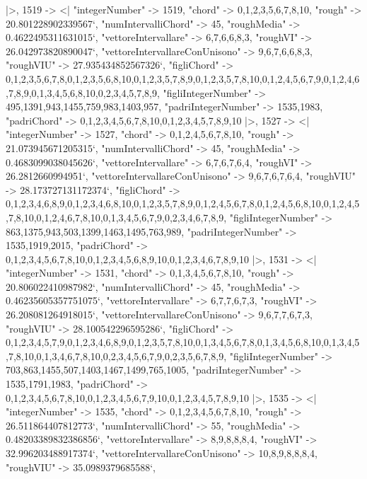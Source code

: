 \documentclass[
]{article}
\begin{document}
\begin{DatasetVerbatim}
  |>,
  1519 -> <|
    "integerNumber" -> 1519,
    "chord" -> {0,1,2,3,5,6,7,8,10},
    "rough" -> 20.801228902339567`,
    "numIntervalliChord" -> 45,
    "roughMedia" -> 0.4622495311631015`,
    "vettoreIntervallare" -> {6,7,6,6,8,3},
    "roughVI" -> 26.042973820890047`,
    "vettoreIntervallareConUnisono" -> {9,6,7,6,6,8,3},
    "roughVIU" -> 27.935434852567326`,
    "figliChord" -> {{0,1,2,3,5,6,7,8},{0,1,2,3,5,6,8,10},{0,1,2,3,5,7,8,9},{0,1,2,3,5,7,8,10},{0,1,2,4,5,6,7,9},{0,1,2,4,6,7,8,9},{0,1,3,4,5,6,8,10},{0,2,3,4,5,7,8,9}},
    "figliIntegerNumber" -> {495,1391,943,1455,759,983,1403,957},
    "padriIntegerNumber" -> {1535,1983},
    "padriChord" -> {{0,1,2,3,4,5,6,7,8,10},{0,1,2,3,4,5,7,8,9,10}}
  |>,
  1527 -> <|
    "integerNumber" -> 1527,
    "chord" -> {0,1,2,4,5,6,7,8,10},
    "rough" -> 21.073945671205315`,
    "numIntervalliChord" -> 45,
    "roughMedia" -> 0.4683099038045626`,
    "vettoreIntervallare" -> {6,7,6,7,6,4},
    "roughVI" -> 26.2812660994951`,
    "vettoreIntervallareConUnisono" -> {9,6,7,6,7,6,4},
    "roughVIU" -> 28.173727131172374`,
    "figliChord" -> {{0,1,2,3,4,6,8,9},{0,1,2,3,4,6,8,10},{0,1,2,3,5,7,8,9},{0,1,2,4,5,6,7,8},{0,1,2,4,5,6,8,10},{0,1,2,4,5,7,8,10},{0,1,2,4,6,7,8,10},{0,1,3,4,5,6,7,9},{0,2,3,4,6,7,8,9}},
    "figliIntegerNumber" -> {863,1375,943,503,1399,1463,1495,763,989},
    "padriIntegerNumber" -> {1535,1919,2015},
    "padriChord" -> {{0,1,2,3,4,5,6,7,8,10},{0,1,2,3,4,5,6,8,9,10},{0,1,2,3,4,6,7,8,9,10}}
  |>,
  1531 -> <|
    "integerNumber" -> 1531,
    "chord" -> {0,1,3,4,5,6,7,8,10},
    "rough" -> 20.806022410987982`,
    "numIntervalliChord" -> 45,
    "roughMedia" -> 0.46235605357751075`,
    "vettoreIntervallare" -> {6,7,7,6,7,3},
    "roughVI" -> 26.208081264918015`,
    "vettoreIntervallareConUnisono" -> {9,6,7,7,6,7,3},
    "roughVIU" -> 28.100542296595286`,
    "figliChord" -> {{0,1,2,3,4,5,7,9},{0,1,2,3,4,6,8,9},{0,1,2,3,5,7,8,10},{0,1,3,4,5,6,7,8},{0,1,3,4,5,6,8,10},{0,1,3,4,5,7,8,10},{0,1,3,4,6,7,8,10},{0,2,3,4,5,6,7,9},{0,2,3,5,6,7,8,9}},
    "figliIntegerNumber" -> {703,863,1455,507,1403,1467,1499,765,1005},
    "padriIntegerNumber" -> {1535,1791,1983},
    "padriChord" -> {{0,1,2,3,4,5,6,7,8,10},{0,1,2,3,4,5,6,7,9,10},{0,1,2,3,4,5,7,8,9,10}}
  |>,
  1535 -> <|
    "integerNumber" -> 1535,
    "chord" -> {0,1,2,3,4,5,6,7,8,10},
    "rough" -> 26.511864407812773`,
    "numIntervalliChord" -> 55,
    "roughMedia" -> 0.48203389832386856`,
    "vettoreIntervallare" -> {8,9,8,8,8,4},
    "roughVI" -> 32.996203488917374`,
    "vettoreIntervallareConUnisono" -> {10,8,9,8,8,8,4},
    "roughVIU" -> 35.0989379685588`,

\end{DatasetVerbatim}
\end{document}
